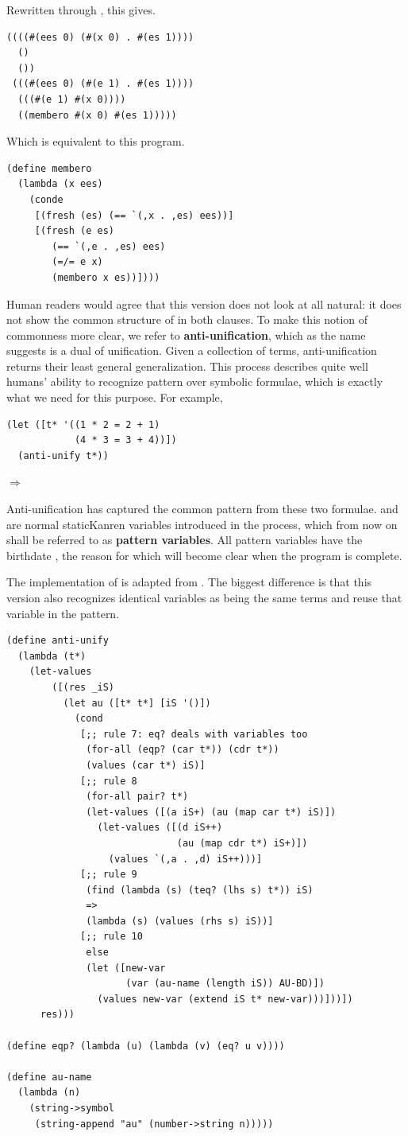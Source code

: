 Rewritten through , this gives.
\begin{lstlisting}
((((#(ees 0) (#(x 0) . #(es 1)))) 
  ()
  ())
 (((#(ees 0) (#(e 1) . #(es 1))))
  (((#(e 1) #(x 0))))
  ((membero #(x 0) #(es 1)))))
\end{lstlisting}
Which is equivalent to this program.
\begin{lstlisting}
(define membero
  (lambda (x ees)
    (conde
     [(fresh (es) (== `(,x . ,es) ees))]
     [(fresh (e es)
        (== `(,e . ,es) ees)
        (=/= e x)
        (membero x es))])))
\end{lstlisting}
Human readers would agree that this version does not look at all natural: it does not show the common structure of  in both clauses. To make this notion of commonness more clear, we refer to \textbf{anti-unification}, which as the name suggests is a dual of unification. Given a collection of terms, anti-unification returns their least general generalization. This process describes quite well humans' ability to recognize pattern over symbolic formulae, which is exactly what we need for this purpose. For example,
\begin{lstlisting}
(let ([t* '((1 * 2 = 2 + 1)
            (4 * 3 = 3 + 4))])
  (anti-unify t*))
\end{lstlisting}
$\Rightarrow$ 

Anti-unification has captured the common pattern from these two formulae.  and  are normal staticKanren variables introduced in the process, which from now on shall be referred to as \textbf{pattern variables}. All pattern variables have the birthdate , the reason for which will become clear when the program is complete.

The implementation of  is adapted from \textcite{ostvold2004functional}. The biggest difference is that this version also recognizes identical variables as being the same terms and reuse that variable in the pattern. 

\begin{lstlisting}
(define anti-unify
  (lambda (t*)
    (let-values
        ([(res _iS)
          (let au ([t* t*] [iS '()])
            (cond
             [;; rule 7: eq? deals with variables too
              (for-all (eqp? (car t*)) (cdr t*))
              (values (car t*) iS)]
             [;; rule 8
              (for-all pair? t*)
              (let-values ([(a iS+) (au (map car t*) iS)])
                (let-values ([(d iS++)
                              (au (map cdr t*) iS+)])
                  (values `(,a . ,d) iS++)))]
             [;; rule 9
              (find (lambda (s) (teq? (lhs s) t*)) iS)
              =>
              (lambda (s) (values (rhs s) iS))]
             [;; rule 10
              else
              (let ([new-var
                     (var (au-name (length iS)) AU-BD)])
                (values new-var (extend iS t* new-var)))]))])
      res)))

(define eqp? (lambda (u) (lambda (v) (eq? u v))))

(define au-name
  (lambda (n)
    (string->symbol
     (string-append "au" (number->string n)))))
\end{lstlisting}

